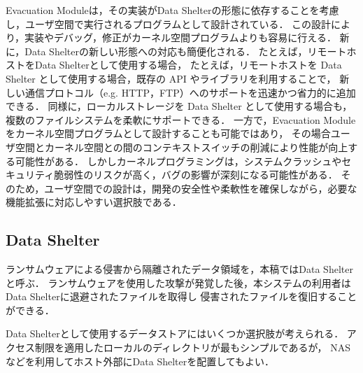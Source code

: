 Evacuation Moduleは，その実装がData Shelterの形態に依存することを考慮し，ユーザ空間で実行されるプログラムとして設計されている．
この設計により，実装やデバッグ，修正がカーネル空間プログラムよりも容易に行える．
新に，Data Shelterの新しい形態への対応も簡便化される．
たとえば，リモートホストをData Shelterとして使用する場合，
たとえば，リモートホストを Data Shelter として使用する場合，既存の API やライブラリを利用することで，
新しい通信プロトコル（e.g. HTTP，FTP）へのサポートを迅速かつ省力的に追加できる．
同様に，ローカルストレージを Data Shelter として使用する場合も，複数のファイルシステムを柔軟にサポートできる．
一方で，Evacuation Module をカーネル空間プログラムとして設計することも可能ではあり，
その場合ユーザ空間とカーネル空間との間のコンテキストスイッチの削減により性能が向上する可能性がある．
しかしカーネルプログラミングは，システムクラッシュやセキュリティ脆弱性のリスクが高く，バグの影響が深刻になる可能性がある．
そのため，ユーザ空間での設計は，開発の安全性や柔軟性を確保しながら，必要な機能拡張に対応しやすい選択肢である．


\subsection{Data Shelter}
ランサムウェアによる侵害から隔離されたデータ領域を，本稿ではData Shelterと呼ぶ．
ランサムウェアを使用した攻撃が発覚した後，本システムの利用者はData Shelterに退避されたファイルを取得し
侵害されたファイルを復旧することができる．

Data Shelterとして使用するデータストアにはいくつか選択肢が考えられる．
アクセス制限を適用したローカルのディレクトリが最もシンプルであるが，
NASなどを利用してホスト外部にData Shelterを配置してもよい．
